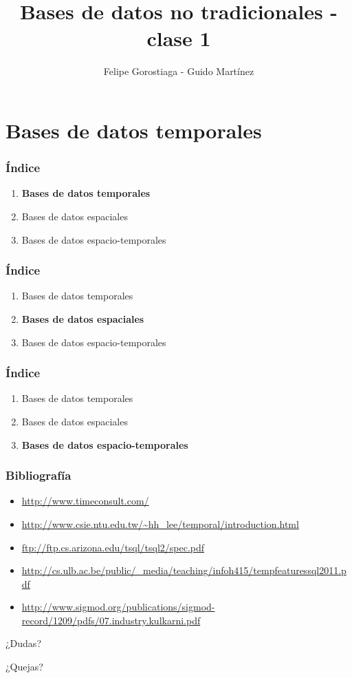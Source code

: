 \documentclass[obeyspaces,spaces,hyphens]{beamer}
\begin{document}
\title{Bases de datos no tradicionales - clase 1}
\author{Felipe Gorostiaga - Guido Martínez}

\begin{frame}
  \titlepage
\end{frame}

\section{Bases de datos temporales}

\begin{frame}
\frametitle{Índice}
	\begin{enumerate}
	\item {\bf Bases de datos temporales}
	\item Bases de datos espaciales
	\item Bases de datos espacio-temporales
	\end{enumerate}
\end{frame}



\begin{frame}
\frametitle{Índice}
	\begin{enumerate}
	\item Bases de datos temporales
	\item {\bf Bases de datos espaciales}
	\item Bases de datos espacio-temporales
	\end{enumerate}
\end{frame}

\begin{frame}
\frametitle{Índice}
	\begin{enumerate}
	\item Bases de datos temporales
	\item Bases de datos espaciales
	\item {\bf Bases de datos espacio-temporales}
	\end{enumerate}
\end{frame}

\begin{frame}
\frametitle{Bibliografía}
\begin{itemize}
	\item \url{http://www.timeconsult.com/}
	\item \url{http://www.csie.ntu.edu.tw/~hh_lee/temporal/introduction.html}
	\item \url{ftp://ftp.cs.arizona.edu/tsql/tsql2/spec.pdf}
	\item \url{http://cs.ulb.ac.be/public/_media/teaching/infoh415/tempfeaturessql2011.pdf}
	\item \url{http://www.sigmod.org/publications/sigmod-record/1209/pdfs/07.industry.kulkarni.pdf}
\end{itemize}
\end{frame}

\begin{frame}
\begin{center}
	¿Dudas?
	\pause

	¿Quejas?
\end{center}
\end{frame}
\end{document}
